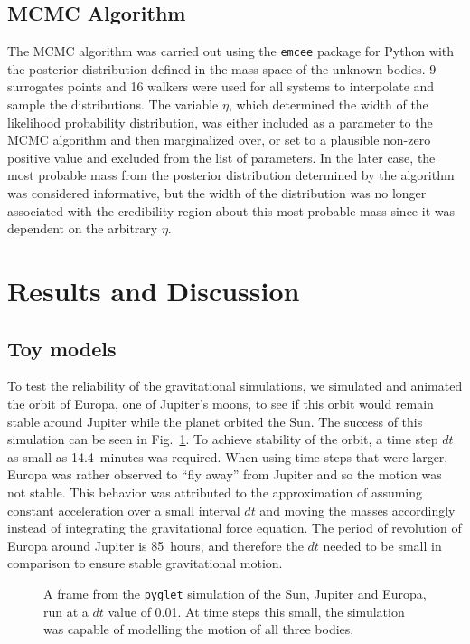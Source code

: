 \documentclass[twocolumn]{aastex63}
\begin{document}
\subsection{MCMC Algorithm}

The MCMC algorithm was carried out using the {\tt\string emcee} package for Python with the posterior distribution defined in the mass space of the unknown bodies. 9 surrogates points and 16 walkers were used for all systems to interpolate and sample the distributions. The variable $\eta$, which determined the width of the likelihood probability distribution, was either included as a parameter to the MCMC algorithm and then marginalized over, or set to a plausible non-zero positive value and excluded from the list of parameters. In the later case, the most probable mass from the posterior distribution determined by the algorithm was considered informative, but the width of the distribution was no longer associated with the credibility region about this most probable mass since it was dependent on the arbitrary $\eta$. 

\section{Results and Discussion}

\subsection{Toy models} \label{ssec:toy_models}

To test the reliability of the gravitational simulations, we simulated and animated the orbit of Europa, one of Jupiter's moons, to see if this orbit would remain stable around Jupiter while the planet orbited the Sun. The success of this simulation can be seen in Fig.~\ref{fig:europa}. To achieve stability of the orbit, a time step $dt$ as small as 14.4~minutes was required. When using time steps that were larger, Europa was rather observed to ``fly away'' from Jupiter and so the motion was not stable. This behavior was attributed to the approximation of assuming constant acceleration over a small interval $dt$ and moving the masses accordingly instead of integrating the gravitational force equation. The period of revolution of Europa around Jupiter is 85~hours, and therefore the $dt$ needed to be small in comparison to ensure stable gravitational motion. 

\begin{figure}[ht!]
\caption{A frame from the {\tt\string pyglet} simulation of the Sun, Jupiter and Europa, run at a $dt$ value of 0.01. At time steps this small, the simulation was capable of modelling the motion of all three bodies.\label{fig:europa}}
\end{figure}
\end{document}
